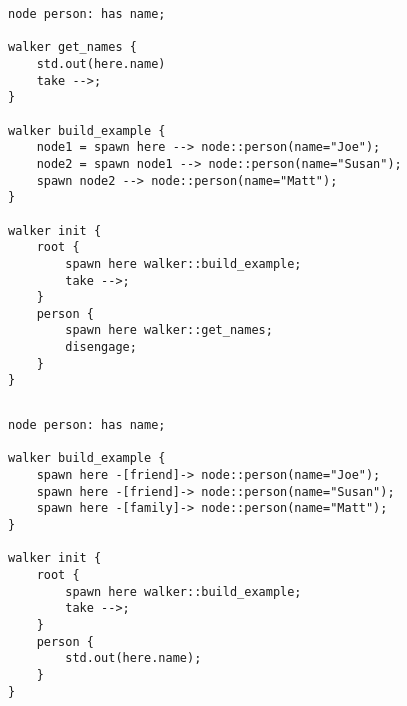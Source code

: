 
\begin{description}
    \begin{lstlisting}[caption={Walking graphs by taking edges}]
node person: has name;

walker get_names {
    std.out(here.name)
    take -->;
}

walker build_example {
    node1 = spawn here --> node::person(name="Joe");
    node2 = spawn node1 --> node::person(name="Susan");
    spawn node2 --> node::person(name="Matt");
}

walker init {
    root {
        spawn here walker::build_example;
        take -->;
    }
    person {
        spawn here walker::get_names;
        disengage;
    }
}
    \end{lstlisting}
    \item[Output] \texttt{}
          \begin{lstlisting}[language=shell]
        \end{lstlisting}
    \item[Description] \texttt{}
\end{description}


\begin{description}
    \begin{lstlisting}[caption={Fan out style walks}]
node person: has name;

walker build_example {
    spawn here -[friend]-> node::person(name="Joe");
    spawn here -[friend]-> node::person(name="Susan");
    spawn here -[family]-> node::person(name="Matt");
}

walker init {
    root {
        spawn here walker::build_example;
        take -->;
    }
    person {
        std.out(here.name);
    }
}
    \end{lstlisting}
    \item[Output] \texttt{}
          \begin{lstlisting}[language=shell]
        \end{lstlisting}
    \item[Description] \texttt{}
\end{description}



